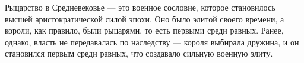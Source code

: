 
Рыцарство в Средневековье --- это военное сословие, которое становилось высшей аристократической силой эпохи. Оно было элитой своего времени, а короли, как правило, были рыцарями, то есть первыми среди равных. Ранее, однако, власть не передавалась по наследству --- короля выбирала дружина, и он становился первым среди равных, что создавало сильную военную элиту.

